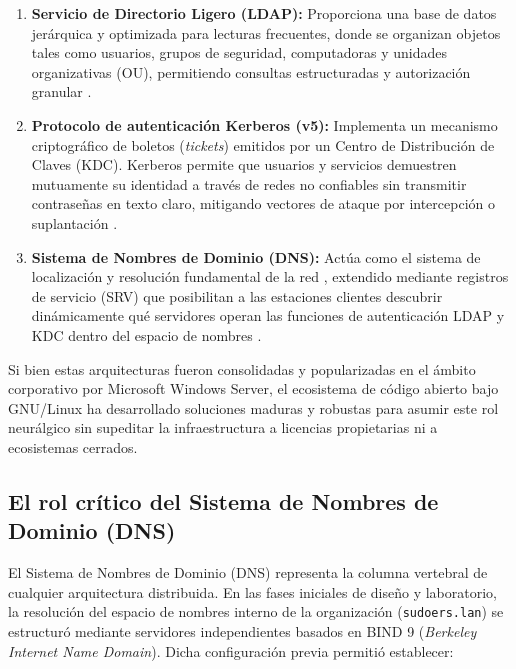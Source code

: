 \begin{enumerate}[label=\alph*)]
    \item \textbf{Servicio de Directorio Ligero (LDAP):} Proporciona una base de datos jerárquica y optimizada para lecturas frecuentes, donde se organizan objetos tales como usuarios, grupos de seguridad, computadoras y unidades organizativas (OU), permitiendo consultas estructuradas y autorización granular \citep{rfc4511}.
    \item \textbf{Protocolo de autenticación Kerberos (v5):} Implementa un mecanismo criptográfico de boletos (\textit{tickets}) emitidos por un Centro de Distribución de Claves (KDC). Kerberos permite que usuarios y servicios demuestren mutuamente su identidad a través de redes no confiables sin transmitir contraseñas en texto claro, mitigando vectores de ataque por intercepción o suplantación \citep{rfc4120}.
    \item \textbf{Sistema de Nombres de Dominio (DNS):} Actúa como el sistema de localización y resolución fundamental de la red \citep{rfc1035}, extendido mediante registros de servicio (SRV) que posibilitan a las estaciones clientes descubrir dinámicamente qué servidores operan las funciones de autenticación LDAP y KDC dentro del espacio de nombres \citep{rfc2782}.
\end{enumerate}

Si bien estas arquitecturas fueron consolidadas y popularizadas en el ámbito corporativo por Microsoft Windows Server, el ecosistema de código abierto bajo GNU/Linux ha desarrollado soluciones maduras y robustas para asumir este rol neurálgico sin supeditar la infraestructura a licencias propietarias ni a ecosistemas cerrados.

\subsection{El rol crítico del Sistema de Nombres de Dominio (DNS)}

El Sistema de Nombres de Dominio (DNS) representa la columna vertebral de cualquier arquitectura distribuida. En las fases iniciales de diseño y laboratorio, la resolución del espacio de nombres interno de la organización (\texttt{sudoers.lan}) se estructuró mediante servidores independientes basados en BIND 9 (\textit{Berkeley Internet Name Domain}). Dicha configuración previa permitió establecer:

